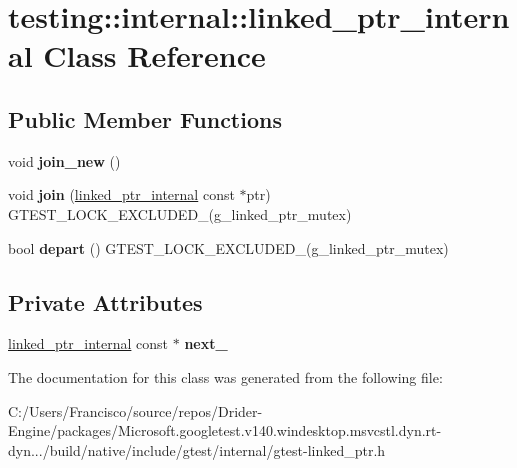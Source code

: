 \hypertarget{classtesting_1_1internal_1_1linked__ptr__internal}{}\section{testing\+:\+:internal\+:\+:linked\+\_\+ptr\+\_\+internal Class Reference}
\label{classtesting_1_1internal_1_1linked__ptr__internal}
\subsection*{Public Member Functions}
\begin{DoxyCompactItemize}
\item 
\mbox{\label{classtesting_1_1internal_1_1linked__ptr__internal_a742af1f65df2d5e2b7198a1b74264a83}} 
void {\bfseries join\+\_\+new} ()
\item 
\mbox{\label{classtesting_1_1internal_1_1linked__ptr__internal_acd5a341459f7e81b10b4112d8c764e2a}} 
void {\bfseries join} (\hyperlink{classtesting_1_1internal_1_1linked__ptr__internal}{linked\+\_\+ptr\+\_\+internal} const $\ast$ptr) G\+T\+E\+S\+T\+\_\+\+L\+O\+C\+K\+\_\+\+E\+X\+C\+L\+U\+D\+E\+D\+\_\+(g\+\_\+linked\+\_\+ptr\+\_\+mutex)
\item 
\mbox{\label{classtesting_1_1internal_1_1linked__ptr__internal_a8699e539d9702d363ef0351012d1b3ca}} 
bool {\bfseries depart} () G\+T\+E\+S\+T\+\_\+\+L\+O\+C\+K\+\_\+\+E\+X\+C\+L\+U\+D\+E\+D\+\_\+(g\+\_\+linked\+\_\+ptr\+\_\+mutex)
\end{DoxyCompactItemize}
\subsection*{Private Attributes}
\begin{DoxyCompactItemize}
\item 
\mbox{\label{classtesting_1_1internal_1_1linked__ptr__internal_ae4397a65a4d76a24547fcf2cd17131d8}} 
\hyperlink{classtesting_1_1internal_1_1linked__ptr__internal}{linked\+\_\+ptr\+\_\+internal} const  $\ast$ {\bfseries next\+\_\+}
\end{DoxyCompactItemize}


The documentation for this class was generated from the following file\+:\begin{DoxyCompactItemize}
\item 
C\+:/\+Users/\+Francisco/source/repos/\+Drider-\/\+Engine/packages/\+Microsoft.\+googletest.\+v140.\+windesktop.\+msvcstl.\+dyn.\+rt-\/dyn.../build/native/include/gtest/internal/gtest-\/linked\+\_\+ptr.\+h\end{DoxyCompactItemize}
